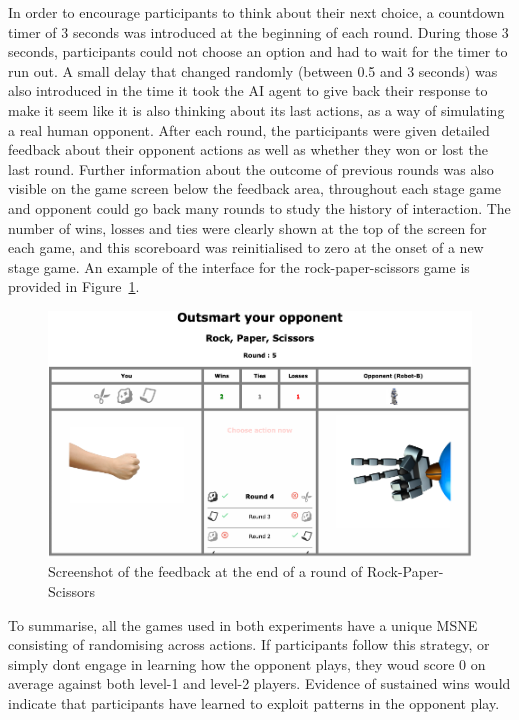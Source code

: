 \documentclass[man,floatsintext]{apa6}
\begin{document}
In order to encourage participants to think about their next choice, a countdown timer of 3 seconds was introduced at the beginning of each round. During those 3 seconds, participants could not choose an option and had to wait for the timer to run out. A small delay that changed randomly (between 0.5 and 3 seconds) was also introduced in the time it took the AI agent to give back their response to make it seem like it is also thinking about its last actions, as a way of simulating a real human opponent. After each round, the participants were given detailed feedback about their opponent actions as well as whether they won or lost the last round. Further information about the outcome of previous rounds was also visible on the game screen below the feedback area, throughout each stage game and opponent could go back many rounds to study the history of interaction. The number of wins, losses and ties were clearly shown at the top of the screen for each game, and this scoreboard was reinitialised to zero at the onset of a new stage game. An example of the interface for the rock-paper-scissors game is provided in Figure~\ref{fig:feedback-rps}.

\begin{figure}

{\centering \includegraphics{../Report/images/feedback_rps} 

}

\caption{Screenshot of the feedback at the end of a round of Rock-Paper-Scissors}\label{fig:feedback-rps}
\end{figure}

To summarise, all the games used in both experiments have a unique MSNE consisting of randomising across actions. If participants follow this strategy, or simply dont engage in learning how the opponent plays, they woud score 0 on average against both level-1 and level-2 players. Evidence of sustained wins would indicate that participants have learned to exploit patterns in the opponent play.
\end{document}
